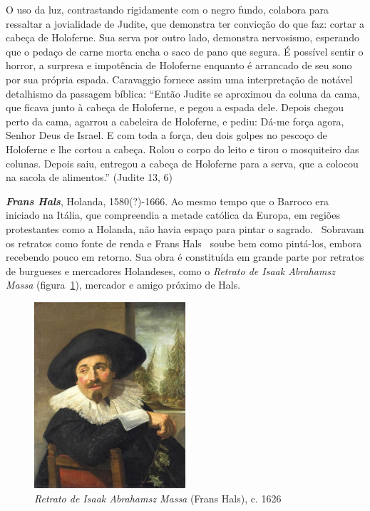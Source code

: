 O uso da luz, contrastando rigidamente com o negro fundo, colabora
para ressaltar a jovialidade de Judite, que demonstra ter convicção do
que faz: cortar a cabeça de Holoferne. Sua serva por outro lado,
demonstra nervosismo, esperando que o pedaço de carne morta encha o
saco de pano que segura. É possível sentir o horror, a surpresa e
impotência de Holoferne enquanto é arrancado de seu sono por sua
própria espada. Caravaggio fornece assim uma interpretação de notável
detalhismo da passagem bíblica: ``Então Judite se aproximou da coluna
da cama, que ficava junto à cabeça de Holoferne, e pegou a espada
dele. Depois chegou perto da cama, agarrou a cabeleira de Holoferne, e
pediu: Dá-me força agora, Senhor Deus de Israel. E com toda a força,
deu dois golpes no pescoço de Holoferne e lhe cortou a cabeça. Rolou o
corpo do leito e tirou o mosquiteiro das colunas. Depois saiu,
entregou a cabeça de Holoferne para a serva, que a colocou na sacola
de alimentos.'' (Judite 13, 6)

\textbf{\emph{Frans Hals}}, Holanda, 1580(?)-1666. Ao mesmo tempo que o
Barroco era iniciado na Itália, que compreendia a metade católica da
Europa, em regiões protestantes como a Holanda, não havia espaço para
pintar o sagrado.~\cite{gombrich} Sobravam os retratos como fonte de
renda e Frans Hals~\cite{grimm} soube bem como pintá-los, embora
recebendo pouco em retorno. Sua obra é constituída em grande parte por
retratos de burgueses e mercadores Holandeses, como o \textit{Retrato
de Isaak Abrahamsz Massa} (figura~\ref{fig:hals:massa}), mercador e
amigo próximo de Hals. 

\begin{figure}
  \vspace{-15pt}
  \begin{centering}
    \caption{\emph{Retrato de Isaak Abrahamsz Massa} (Frans Hals), c. 1626}
    \label{fig:hals:massa}
    \includegraphics[width=0.5\textwidth]{figs/hals_massa.png}
  \end{centering}
\end{figure}

